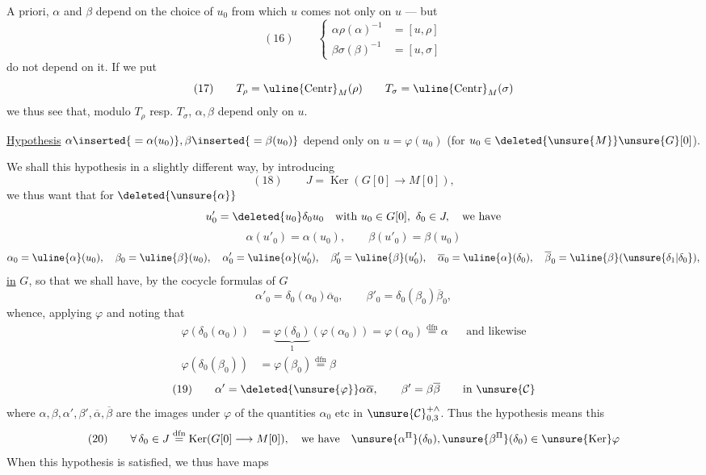 
A priori, $\alpha$ and $\beta$ depend on the choice of $u_0$ from which $u$ comes
not only on $u$ --- but
\[
(16)\qquad
\left\{\begin{aligned}
\alpha\rho(\alpha)^{-1}&=[u,\rho]\\
\beta\sigma(\beta)^{-1}&=[u,\sigma]
\end{aligned}\right.
\]
do not depend on it. If we put
\[
(17)\qquad
T_{\rho}=\uline{\mathrm{Centr}}_M(\rho)
\qquad
T_{\sigma}=\uline{\mathrm{Centr}}_M(\sigma)
\]
we thus see that, modulo $T_{\rho}$ resp. $T_{\sigma}$,
$\alpha,\beta$ depend only on $u$.

\uline{Hypothesis}
$\alpha\inserted{{}=\alpha(u_0)},\beta\inserted{{}=\beta(u_0)}$
depend only on $u=\varphi(u_0)$
(for $u_0\in\deleted{\unsure{M}}\unsure{G}[0]$).

We shall  this hypothesis in a slightly different way,
by introducing
\[
(18)\qquad J=\operatorname{Ker}(G[0]\longrightarrow M[0]),
\]
we thus want that for $\deleted{\unsure{\alpha}}$
\[
u'_0=\deleted{u_0}\delta_0u_0\quad
\text{with }u_0\in G[0],\ \delta_0\in J,\quad\text{we have}
\]
\[
\alpha(u'_0)=\alpha(u_0),\qquad \beta(u'_0)=\beta(u_0)
\]
\[
\begin{gathered}
\alpha_0=\uline{\alpha}(u_0),\quad
\beta_0=\uline{\beta}(u_0),\quad
\alpha'_0=\uline{\alpha}(u'_0),\quad
\beta'_0=\uline{\beta}(u'_0),\quad
\overline{\alpha}_0=\uline{\alpha}(\delta_0),\quad
\overline{\beta}_0=\uline{\beta}(\unsure{\delta_1|\delta_0}),
\end{gathered}
\]
\uline{in} $G$, so that we shall have, by the cocycle formulas of $G$
\[
\alpha'_0=\delta_0(\alpha_0)\overline{\alpha}_0,
\qquad
\beta'_0=\delta_0(\beta_0)\overline{\beta}_0,
\]
whence, applying $\varphi$ and noting that
\[
\begin{aligned}
\varphi(\delta_0(\alpha_0))
&=\underbrace{\varphi(\delta_0)}_{1}(\varphi(\alpha_0))
=\varphi(\alpha_0)\overset{\mathrm{dfn}}=\alpha
&&\text{and likewise}\\
\varphi(\delta_0(\beta_0))&=\varphi(\beta_0)\overset{\mathrm{dfn}}=\beta
\end{aligned}
\]
\[
(19)\qquad
\alpha'=\deleted{\unsure{\varphi}}\alpha\overline{\alpha},\qquad
\beta'=\beta\overline{\beta}\qquad\text{in }\unsure{\mathcal{C}}
\]
where $\alpha,\beta,\alpha',\beta',\overline{\alpha},\overline{\beta}$ are the images under
$\varphi$ of the quantities $\alpha_0$ etc in $\unsure{\mathcal{C}}_{0,3}^{+\wedge}$.
Thus the hypothesis means this
\[
(20)\qquad
\forall\,\delta_0\in J\overset{\mathrm{dfn}}=
\operatorname{Ker}(G[0]\longrightarrow M[0]),\quad
\text{we have}\quad
\unsure{\alpha^{\Pi}}(\delta_0),\unsure{\beta^{\Pi}}(\delta_0)
\in\unsure{\operatorname{Ker}}\varphi
\]
When this hypothesis is satisfied, we thus have maps

